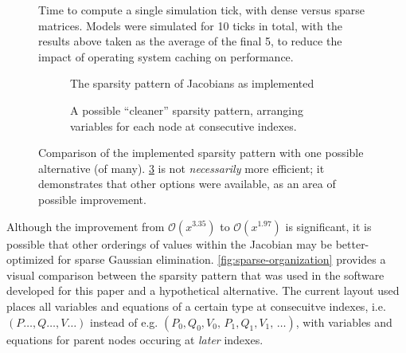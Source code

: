 
\begin{figure}[p!]
    \centering
    \begin{tikzpicture}
        
    \end{tikzpicture}
    \caption{
        Time to compute a single simulation tick, with dense versus sparse matrices. Models were
        simulated for 10 ticks in total, with the results above taken as the average of the final 5,
        to reduce the impact of operating system caching on performance.
    }
    \label{fig:sparse-speed}
\end{figure}

\begin{figure}[p!]
    \centering
    \begin{subfigure}[t]{.47\textwidth}
        \centering
        \caption{ The sparsity pattern of Jacobians as implemented }
        \label{subfig:sparse-organization-implemented}
    \end{subfigure}%
    \hspace{1em}%
    \begin{subfigure}[t]{.47\textwidth}
        \centering
        \caption{
            A possible ``cleaner'' sparsity pattern, arranging variables for each node at
            consecutive indexes.
        }
        \label{subfig:sparse-organization-hypothetical}
    \end{subfigure}
    \caption{
        Comparison of the implemented sparsity pattern with one possible alternative (of many).
        \ref{subfig:sparse-organization-hypothetical} is not \textit{necessarily} more efficient; it
        demonstrates that other options were available, as an area of possible improvement.
    }
    \label{fig:sparse-organization}
\end{figure}

Although the improvement from $\mathcal{O}(x^{3.35})$ to $\mathcal{O}(x^{1.97})$ is significant, it
is possible that other orderings of values within the Jacobian may be better-optimized for sparse
Gaussian elimination. \autoref{fig:sparse-organization} provides a visual comparison between the
sparsity pattern that was used in the software developed for this paper and a hypothetical
alternative. The current layout used places all variables and equations of a certain type at
consecuitve indexes, i.e. $(P\dots, Q\dots, V\dots)$ instead of e.g.
$(P_0,Q_0,V_0,\,P_1,Q_1,V_1,\,\dots)$, with variables and equations for parent nodes occuring at
\textit{later} indexes.

